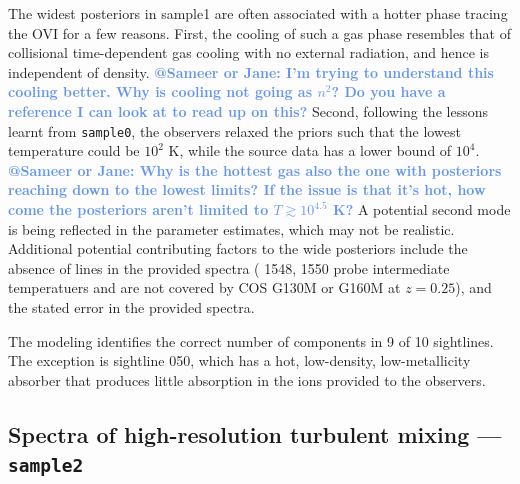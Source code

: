 \documentclass[fleqn,usenatbib]{mnras}
\makeatletter
\newcommand{\atsameer}[1]{\textcolor{CornflowerBlue}{\textbf{@Sameer or Jane: #1}}}
\makeatother
\begin{document}
The widest posteriors in sample1 are often associated with a hotter phase tracing the OVI for a few reasons.
First, the cooling of such a gas phase resembles that of collisional time-dependent gas cooling with no external radiation, and hence is independent of density.
\atsameer{I'm trying to understand this cooling better. Why is cooling not going as $n^2$? Do you have a reference I can look at to read up on this?}
Second, following the lessons learnt from \texttt{sample0}, the observers relaxed the priors such that the lowest temperature could be $10^2$ K, while the source data has a lower bound of $10^4$.
\atsameer{Why is the hottest gas also the one with posteriors reaching down to the lowest limits? If the issue is that it's hot, how come the posteriors aren't limited to $T \gtrsim 10^4.5$ K?}
A potential second mode is being reflected in the parameter estimates, which may not be realistic. 
Additional potential contributing factors to the wide posteriors include the absence of  lines in the provided spectra ( 1548, 1550 probe intermediate temperatuers and are not covered by COS G130M or G160M at $z=0.25$), 
and the stated error in the provided spectra.

The modeling identifies the correct number of components in 9 of 10 sightlines.
The exception is sightline 050, which has a hot, low-density, low-metallicity absorber that produces little absorption in the ions provided to the observers.

\subsection{Spectra of high-resolution turbulent mixing --- \texttt{sample2}}
\label{s: results -- sample2}
\end{document}
